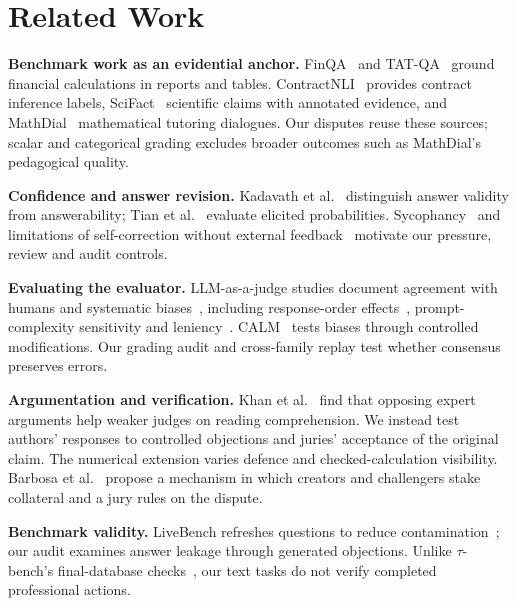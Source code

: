 \section{Related Work}
\label{sec:related-work}
\textbf{Benchmark work as an evidential anchor.}
FinQA~\cite{chen2021} and TAT-QA~\cite{zhu2021} ground financial calculations
in reports and tables. ContractNLI~\cite{koreeda2021} provides contract
inference labels, SciFact~\cite{wadden2020} scientific claims with annotated
evidence, and MathDial~\cite{macina2023} mathematical tutoring dialogues.
Our disputes reuse these sources; scalar and categorical grading excludes
broader outcomes such as MathDial's pedagogical quality.

\textbf{Confidence and answer revision.}
Kadavath et al.~\cite{kadavath2022} distinguish answer validity from
answerability; Tian et al.~\cite{tian2023} evaluate elicited probabilities.
Sycophancy~\cite{sharma2024} and limitations of self-correction without
external feedback~\cite{huang2024} motivate our pressure, review and audit
controls.

\textbf{Evaluating the evaluator.}
LLM-as-a-judge studies document agreement with humans and systematic
biases~\cite{zheng2023}, including response-order effects~\cite{wang2024},
prompt-complexity sensitivity and leniency~\cite{thakur2025}.
CALM~\cite{ye2024} tests biases through controlled modifications. Our grading
audit and cross-family replay test whether consensus preserves errors.

\textbf{Argumentation and verification.}
Khan et al.~\cite{khan2024} find that opposing expert arguments help weaker
judges on reading comprehension. We instead test authors' responses to
controlled objections and juries' acceptance of the original claim. The
numerical extension varies defence and checked-calculation visibility.
Barbosa et al.~\cite{barbosa2025veracity} propose a mechanism in which
creators and challengers stake collateral and a jury rules on the dispute.

\textbf{Benchmark validity.}
LiveBench refreshes questions to reduce contamination~\cite{white2024}; our
audit examines answer leakage through generated objections. Unlike
$\tau$-bench's final-database checks~\cite{yao2024}, our text tasks do not verify
completed professional actions.
